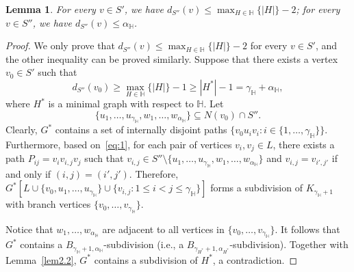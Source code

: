 \documentclass[11pt, a4paper]{article}
\newtheorem{lemma}[theorem]{Lemma}
\theoremstyle{definition}
\newcommand{\<}{\subseteq}
\begin{document}
\begin{lemma}\label{lem3.1}
      For every $v\in S'$, %
    we have $d_{S''}(v)\leq \max_{H\in \mathbb{H}}\{|H|\}-2$; for every $v\in S''$, we have $d_{S''}(v)\leq\alpha_{\mathbb{H}}$.
\end{lemma}
  \begin{proof}
    We only prove that $d_{S''}(v)\leq \max_{H\in \mathbb{H}}\{|H|\}-2$ for every  $v\in S'$, and the other inequality can be proved similarly.
    Suppose that there exists a vertex $v_0\in S'$ such that $$d_{S''}(v_0)\geq\max_{H\in \mathbb{H}}\{|H|\}-1\geq |H^*|-1=\gamma_{\mathbb{H}}+\alpha_{\mathbb{H}},$$
    where $H^*$ is a minimal graph with respect to $\mathbb{H}$. 
    Let 
    $$
    \{u_1,\ldots, u_{\gamma_{\mathbb{H}}},w_1,\ldots, w_{\alpha_{\mathbb{H}}}\}\subseteq N(v_0)\cap S''.
    $$
    Clearly, $G^*$ contains a set of internally disjoint paths $\{v_0u_iv_i:i\in \{1,\ldots,\gamma_{\mathbb{H}}\}\}$.
    Furthermore, based on~\eqref{eq:1}, for each pair of vertices $v_i,v_j\in L$,  there exists a path $P_{ij}=v_iv_{i,j}v_j$ such that $v_{i,j}\in S''\setminus \{u_1,\ldots, u_{\gamma_{\mathbb{H}}},w_1,\ldots, w_{\alpha_{\mathbb{H}}}\}$ and $v_{i,j}=v_{i',j'}$ if and only if $(i,j)=(i',j')$. Therefore, $G^*[L\cup \{v_0,u_1,\ldots, u_{\gamma_{\mathbb{H}}}\}\cup \{v_{i,j}:1\leq i<j\leq \gamma_{\mathbb{H}}\}]$ forms a subdivision of $K_{\gamma_{\mathbb{H}}+1}$ with branch vertices $\{v_0,\ldots, v_{\gamma_{\mathbb{H}}}\}$. 
    
    Notice that $w_1,\ldots, w_{\alpha_{\mathbb{H}}}$ are adjacent to all vertices in $\{v_0,\ldots, v_{\gamma_{\mathbb{H}}}\}$. It follows that $G^*$ contains a $B_{\gamma_{\mathbb{H}}+1,\alpha_{\mathbb{H}}}$-subdivision (i.e., a $B_{\gamma_{H^*}+1,\alpha_{H^*}}$-subdivision). Together with Lemma~\ref{lem2.2}, $G^*$ contains a subdivision of $H^*$, a contradiction.
  \end{proof}
\end{document}
